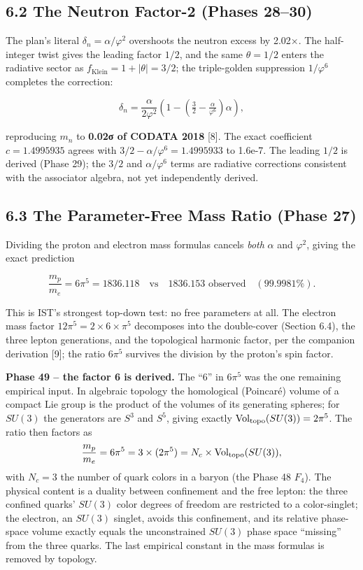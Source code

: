 \documentclass[
  11pt,
]{article}
\begin{document}
\subsection{6.2 The Neutron Factor-2 (Phases
28--30)}\label{the-neutron-factor-2-phases-2830}

The plan's literal \(\delta_n = \alpha/\varphi^2\) overshoots the
neutron excess by 2.02×. The half-integer twist gives the leading factor
\(1/2\), and the same \(\theta = 1/2\) enters the radiative sector as
\(f_{\text{Klein}} = 1 + |\theta| = 3/2\); the triple-golden suppression
\(1/\varphi^6\) completes the correction:

\[\delta_n = \frac{\alpha}{2\varphi^2}\left(1 - \left(\tfrac{3}{2} - \tfrac{\alpha}{\varphi^6}\right)\alpha\right),\]

reproducing \(m_n\) to \textbf{0.02σ of CODATA 2018} {[}8{]}. The exact
coefficient \(c = 1.4995935\) agrees with
\(3/2 - \alpha/\varphi^6 = 1.4995933\) to 1.6e-7. The leading \(1/2\) is
derived (Phase 29); the \(3/2\) and \(\alpha/\varphi^6\) terms are
radiative corrections consistent with the associator algebra, not yet
independently derived.

\subsection{6.3 The Parameter-Free Mass Ratio (Phase
27)}\label{the-parameter-free-mass-ratio-phase-27}

Dividing the proton and electron mass formulas cancels \emph{both}
\(\alpha\) and \(\varphi^2\), giving the exact prediction

\[\frac{m_p}{m_e} = 6\pi^5 = 1836.118 \quad\text{vs}\quad 1836.153 \text{ observed}\quad (99.9981\%).\]

This is IST's strongest top-down test: no free parameters at all. The
electron mass factor \(12\pi^5 = 2 \times 6 \times \pi^5\) decomposes
into the double-cover (Section 6.4), the three lepton generations, and
the topological harmonic factor, per the companion derivation {[}9{]};
the ratio \(6\pi^5\) survives the division by the proton's spin factor.

\textbf{Phase 49 -- the factor 6 is derived.} The ``6'' in \(6\pi^5\)
was the one remaining empirical input. In algebraic topology the
homological (Poincaré) volume of a compact Lie group is the product of
the volumes of its generating spheres; for \(SU(3)\) the generators are
\(S^3\) and \(S^5\), giving exactly
\({\rm Vol}_{\text{topo}}(SU(3)) = 2\pi^5\). The ratio then factors as
\[\frac{m_p}{m_e} = 6\pi^5 = 3 \times (2\pi^5) = N_c \times {\rm Vol}_{\text{topo}}(SU(3)),\]
with \(N_c = 3\) the number of quark colors in a baryon (the Phase 48
\(F_4\)). The physical content is a duality between confinement and the
free lepton: the three confined quarks' \(SU(3)\) color degrees of
freedom are restricted to a color-singlet; the electron, an \(SU(3)\)
singlet, avoids this confinement, and its relative phase-space volume
exactly equals the unconstrained \(SU(3)\) phase space ``missing'' from
the three quarks. The last empirical constant in the mass formulas is
removed by topology.
\end{document}
